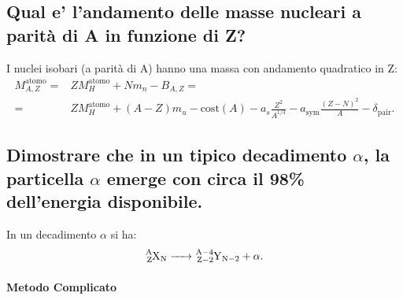 \subsection[]{ Qual e' l'andamento delle masse nucleari a parità di A in funzione di Z?}
I nuclei isobari (a parità di A) hanno una massa con andamento quadratico in Z:
\begin{align*}
	M_{A,Z}^{\text{atomo}} =& ZM_H^{\text{atomo}} + Nm_n - B_{A,Z} =\\
	=&ZM_H^{\text{atomo}}+\left(A-Z\right)m_u-\text{cost}\left(A\right)-a_s\frac{Z^2}{A^{1/3}}-a_{\text{sym}}\frac{\left(Z-N\right)^2}{A}-\delta_{\text{pair}}
.\end{align*}

\subsection[]{ Dimostrare che in un tipico decadimento $\alpha$, la particella $\alpha$ emerge con circa il 98\% dell'energia disponibile.}
In un decadimento $\alpha$ si ha:
\[
\ce{\ce{^{A}_{Z}X_{N}} -> \ce{^{A-4}_{Z-2}Y_{N-2}} + \alpha}
.\]
\paragraph{Metodo Complicato}%


